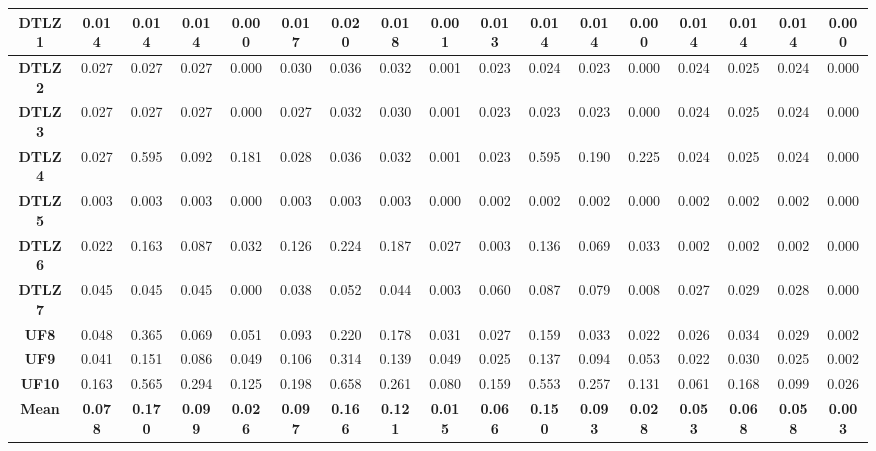 \begin{table*}[t]
\begin{tabular}{c|c|c|c|c|c|c|c|c|c|c|c|c|c|c|c|c|}
\multicolumn{1}{|c|}{\textbf{DTLZ1}} & 0.014 & 0.014 & 0.014 & 0.000 & 0.017 & 0.020 & 0.018 & 0.001 & 0.013 & 0.014 & 0.014 & 0.000 & 0.014 & 0.014 & 0.014 & 0.000 \\ \hline
\multicolumn{1}{|c|}{\textbf{DTLZ2}} & 0.027 & 0.027 & 0.027 & 0.000 & 0.030 & 0.036 & 0.032 & 0.001 & 0.023 & 0.024 & 0.023 & 0.000 & 0.024 & 0.025 & 0.024 & 0.000 \\ \hline
\multicolumn{1}{|c|}{\textbf{DTLZ3}} & 0.027 & 0.027 & 0.027 & 0.000 & 0.027 & 0.032 & 0.030 & 0.001 & 0.023 & 0.023 & 0.023 & 0.000 & 0.024 & 0.025 & 0.024 & 0.000 \\ \hline
\multicolumn{1}{|c|}{\textbf{DTLZ4}} & 0.027 & 0.595 & 0.092 & 0.181 & 0.028 & 0.036 & 0.032 & 0.001 & 0.023 & 0.595 & 0.190 & 0.225 & 0.024 & 0.025 & 0.024 & 0.000 \\ \hline
\multicolumn{1}{|c|}{\textbf{DTLZ5}} & 0.003 & 0.003 & 0.003 & 0.000 & 0.003 & 0.003 & 0.003 & 0.000 & 0.002 & 0.002 & 0.002 & 0.000 & 0.002 & 0.002 & 0.002 & 0.000 \\ \hline
\multicolumn{1}{|c|}{\textbf{DTLZ6}} & 0.022 & 0.163 & 0.087 & 0.032 & 0.126 & 0.224 & 0.187 & 0.027 & 0.003 & 0.136 & 0.069 & 0.033 & 0.002 & 0.002 & 0.002 & 0.000 \\ \hline
\multicolumn{1}{|c|}{\textbf{DTLZ7}} & 0.045 & 0.045 & 0.045 & 0.000 & 0.038 & 0.052 & 0.044 & 0.003 & 0.060 & 0.087 & 0.079 & 0.008 & 0.027 & 0.029 & 0.028 & 0.000 \\ \hline
\multicolumn{1}{|c|}{\textbf{UF8}} & 0.048 & 0.365 & 0.069 & 0.051 & 0.093 & 0.220 & 0.178 & 0.031 & 0.027 & 0.159 & 0.033 & 0.022 & 0.026 & 0.034 & 0.029 & 0.002 \\ \hline
\multicolumn{1}{|c|}{\textbf{UF9}} & 0.041 & 0.151 & 0.086 & 0.049 & 0.106 & 0.314 & 0.139 & 0.049 & 0.025 & 0.137 & 0.094 & 0.053 & 0.022 & 0.030 & 0.025 & 0.002 \\ \hline
\multicolumn{1}{|c|}{\textbf{UF10}} & 0.163 & 0.565 & 0.294 & 0.125 & 0.198 & 0.658 & 0.261 & 0.080 & 0.159 & 0.553 & 0.257 & 0.131 & 0.061 & 0.168 & 0.099 & 0.026 \\ \hline
\multicolumn{1}{|c|}{\textbf{Mean}} & \textbf{0.078} & \textbf{0.170} & \textbf{0.099} & \textbf{0.026} & \textbf{0.097} & \textbf{0.166} & \textbf{0.121} & \textbf{0.015} & \textbf{0.066} & \textbf{0.150} & \textbf{0.093} & \textbf{0.028} & \textbf{0.053} & \textbf{0.068} & \textbf{0.058} & \textbf{0.003} \\ \hline
\end{tabular}%
\end{table*}

